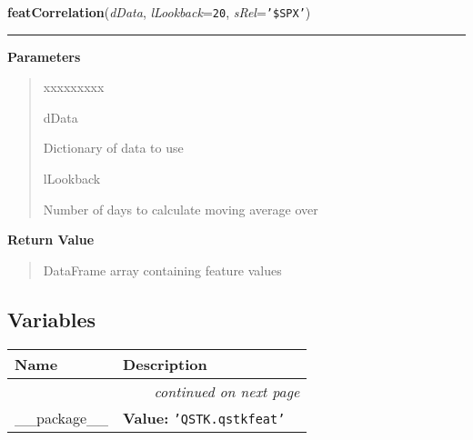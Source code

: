 \hspace{.8\funcindent}\begin{boxedminipage}{\funcwidth}

    \raggedright \textbf{featCorrelation}(\textit{dData}, \textit{lLookback}={\tt 20}, \textit{sRel}={\tt \texttt{'}\texttt{\$SPX}\texttt{'}})

    \vspace{-1.5ex}

    \rule{\textwidth}{0.5\fboxrule}
\setlength{\parskip}{2ex}
\setlength{\parskip}{1ex}
      \textbf{Parameters}
      \vspace{-1ex}

      \begin{quote}
        \begin{Ventry}{xxxxxxxxx}

          \item[dData]

          Dictionary of data to use

          \item[lLookback]

          Number of days to calculate moving average over

        \end{Ventry}

      \end{quote}

      \textbf{Return Value}
    \vspace{-1ex}

      \begin{quote}
      DataFrame array containing feature values

      \end{quote}

    \end{boxedminipage}



  \subsection{Variables}

    \vspace{-1cm}
\hspace{\varindent}\begin{longtable}{|p{\varnamewidth}|p{\vardescrwidth}|l}
\cline{1-2}
\cline{1-2} \centering \textbf{Name} & \centering \textbf{Description}& \\
\cline{1-2}
\endhead\cline{1-2}\multicolumn{3}{r}{\small\textit{continued on next page}}\\\endfoot\cline{1-2}
\endlastfoot\raggedright \_\-\_\-p\-a\-c\-k\-a\-g\-e\-\_\-\_\- & \raggedright \textbf{Value:} 
{\tt \texttt{'}\texttt{QSTK.qstkfeat}\texttt{'}}&\\
\cline{1-2}
\end{longtable}

